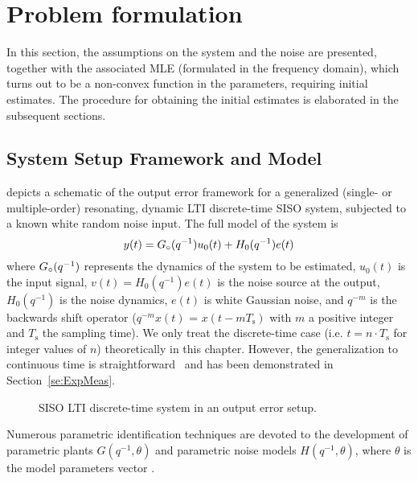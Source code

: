 \section{Problem formulation}\label{se:ProbForm}

In this section, the assumptions on the system and the noise are presented, together with the associated MLE (formulated in the frequency domain), which turns out to be a non-convex function in the parameters, requiring initial estimates. The procedure for obtaining the initial estimates is elaborated in the subsequent sections.

\subsection{System Setup Framework and Model}
 depicts a schematic of the output error framework for  a generalized (single- or multiple-order) resonating, dynamic \gls{LTI} discrete-time \gls{SISO} system, subjected to a known white random noise input. 
The full model of the system is
\begin{equation}\label{lpmtd1}
y(t)={G}_{\circ}(q^{-1})u_0(t)+H_0(q^{-1})e(t)
\end{equation}
where ${G}_{\circ}(q^{-1})$ represents the dynamics of the system to be estimated, $u_0(t)$ is the input signal, $v(t)= H_0(q^{-1})e(t)$ is the noise source at the output, $H_0(q^{-1})$ is the noise dynamics, 
$e(t)$ is white Gaussian noise, and $q^{-m}$ is the backwards shift operator ($q^{-m}x(t)$ = $x(t-mT_{\mathrm{s}})$  with $m$ a positive integer and $T_{\mathrm{s}}$ the sampling time).
We only treat the discrete-time case (i.e. $t = n \cdot T_{\mathrm{s}}$ for integer values of $n$) theoretically in this chapter.
However, the generalization to continuous time is straightforward~\citep[Chapter 6]{Pintelon2012} and has been demonstrated in Section~\ref{se:ExpMeas}.

\begin{figure}[tbh]
\centering

\caption[Output-error set-up.]{SISO LTI discrete-time system in an output error setup.}
\label{fig:oesetup}
\end{figure}

Numerous parametric identification techniques are devoted to the development of parametric plants $G(q^{-1},\theta)$ and parametric noise models  $H(q^{-1},\theta)$, where  $\theta$ is the model parameters vector  \citep{Ljung1999,Soderstrom1989}.

